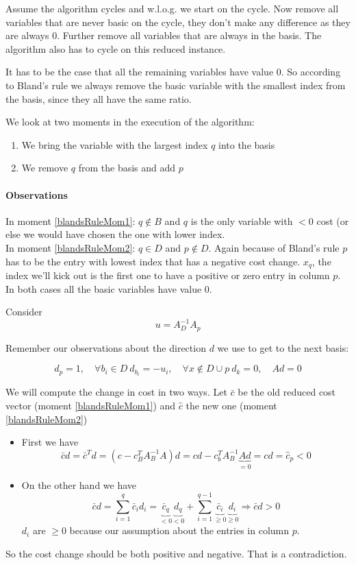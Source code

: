 \begin{pr} Assume the algorithm cycles and w.l.o.g. we start on the cycle. Now remove all variables that are never basic on the cycle, they don't make any difference as they are always 0. Further remove all variables that are always in the basis. The algorithm also has to cycle on this reduced instance. 

It has to be the case that all the remaining variables have value 0. %
So according to Bland's rule we always remove the basic variable with the smallest index from the basis, since they all have the same ratio.

We look at two moments in the execution of the algorithm:

\begin{enumerate}
\item \label{blandsRuleMom1} We bring the variable with the largest index $q$ into the basis
\item \label{blandsRuleMom2} We remove $q$ from the basis and add $p$
\end{enumerate}

\paragraph{Observations} In moment \ref{blandsRuleMom1}: $q\not \in B$ and $q$ is the only variable with $<0$ cost (or else we would have chosen the one with lower index. \\
In moment \ref{blandsRuleMom2}: $q\in D$ and $p\not \in D$. Again because of Bland's rule $p$ has to be the entry with lowest index that has a negative cost change. $x_q$, the index we'll kick out is the first one to have a positive or zero entry in column $p$. In both cases all the basic variables have value 0.

Consider 
\[u=A_D^{-1}A_p\]

Remember our observations about the direction $d$ we use to get to the next basis:

\[d_p =1, \quad \forall b_i \in D\ d_{b_i} = -u_i, \quad \forall x\not \in D\cup p\ d_k=0, \quad Ad=0\]

We will compute the  change in cost in two ways. Let $\bar c$ be the old reduced cost vector (moment \ref{blandsRuleMom1}) and $\hat c$ the new one (moment \ref{blandsRuleMom2})

\begin{itemize}
\item First we have 
\[\bar cd = \bar c^{T} d = (c - c_B^T A_B^{-1} A) d= cd - c_b^T A_B^{-1}\underbrace{Ad}_{=0} = cd = \hat c_p<0\]

\item On the other hand we have
\[\bar c d = \sum_{i=1}^{q} \bar c_i d_i = \underbrace{\bar c_q}_{<0}\underbrace{d_q}_{<0} + \sum _{i=1}^{q-1} \underbrace{\bar c_i}_{\geq 0}\underbrace{d_i}_{\geq 0} \Rightarrow \bar c d >0\]
$d_i$ are $\geq 0$ because our assumption about the entries in column $p$. %

\end{itemize}

So the cost change should be both positive and negative. That is a contradiction.
\end{pr}

